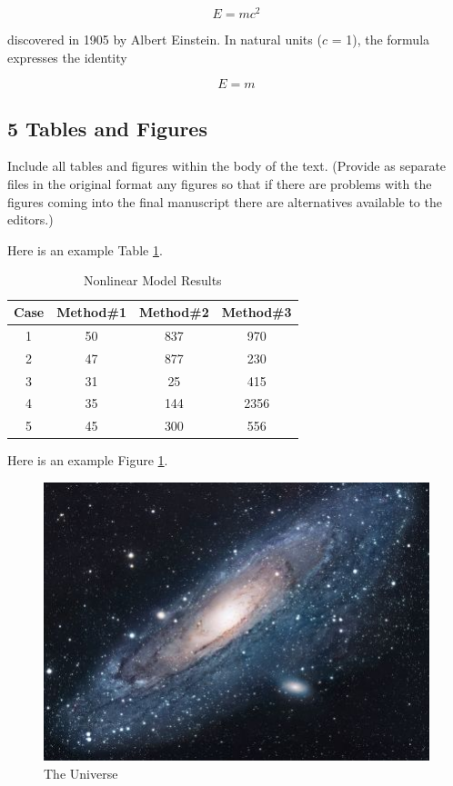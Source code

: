 \documentclass{ccsc_paper}
\begin{document}
$$E=mc^2$$

discovered in 1905 by Albert Einstein.
In natural units ($c$ = 1), the formula expresses the identity

\begin{equation}
E=m
\end{equation}

\subsection{5 Tables and Figures}
Include all tables and figures within the body of the text. (Provide as separate files in the original format any figures so that if there are problems with the figures coming into the final manuscript there are alternatives available to the editors.)

Here is an example Table \ref{table:nonlin}.

\begin{table}[ht]
\caption{Nonlinear Model Results} %
\label{table:nonlin} %
\centering %
\begin{tabular}{c c c c} %
\hline\hline %
Case & Method\#1 & Method\#2 & Method\#3 \\ [0.5ex] %
\hline %
1 & 50 & 837 & 970 \\ %
2 & 47 & 877 & 230 \\
3 & 31 & 25 & 415 \\
4 & 35 & 144 & 2356 \\
5 & 45 & 300 & 556 \\ [1ex] %
\hline %
\end{tabular}
\end{table}

Here is an example Figure \ref{figure:universe}.

\begin{figure}[h!]
\centering
\includegraphics[scale=1.7]{universe}
\caption{The Universe}
\label{figure:universe}
\end{figure}
\end{document}
